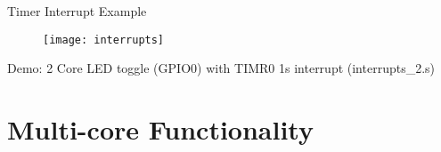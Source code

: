 \documentclass[aspectratio=169]{beamer}
\begin{document}
\begin{frame}{Timer Interrupt Example}
    \begin{figure}
        \centering
        \texttt{[image: interrupts]}
    \end{figure}
    Demo: 2 Core LED toggle (GPIO0) with TIMR0 1s interrupt (interrupts\_2.s)
\end{frame}

\iffalse
\begin{frame}{Timer Peripheral Registers}
    \begin{figure}
        \centering
        \texttt{[image: rtimer]}
        \caption{$t = 20{ns} * {load} * {prescaler}$}
        \label{}
    \end{figure}
    Resolution (32-bit timer): 20ns to 85s.
    
    Examples: 
    \begin{itemize}
        \item For 1us: Load = 0x32, Prescaler = 0 (20ns * 0x32 = 1000ns)
        \item For 1s:  Load = 0x1000, Prescaler = 0x3000 (demo)\\(20ns * 0x1000 * 0x3000 = approx. 1s)
    \end{itemize}
\end{frame}
\fi

\section{Multi-core Functionality}
\frame{\vspace{-1cm}\tableofcontents[currentsection, subsectionstyle=show/show/hide]}
\end{document}
